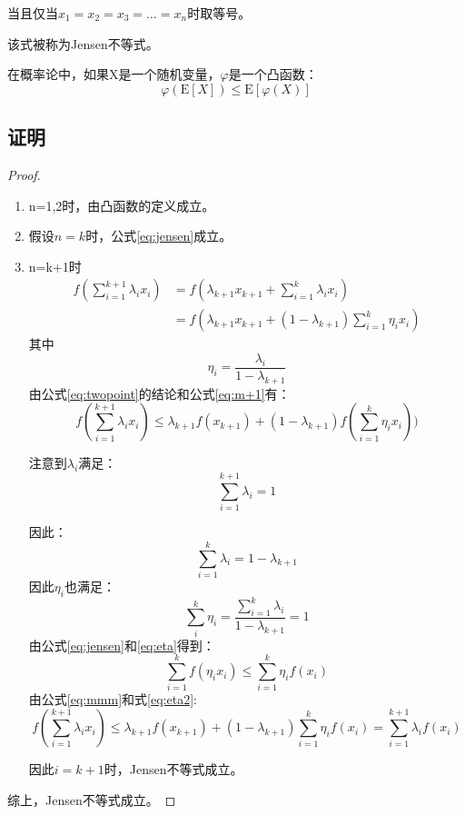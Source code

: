\documentclass[a4paper]{article} %
\numberwithin{equation}{section} %
\begin{document}
当且仅当$x_1=x_2=x_3=\ldots=x_n$时取等号。

该式被称为Jensen不等式。

在概率论中，如果X是一个随机变量，$\varphi$是一个凸函数：
\begin{equation}
\varphi(\mathrm{E}[X])\le \mathrm{E}[\varphi(X)]
\end{equation}

\subsection{证明}

\begin{proof}
\begin{enumerate}
\item n=1,2时，由凸函数的定义成立。
\item 假设$n=k$时，公式\eqref{eq:jensen}成立。
\item n=k+1时
\begin{align}
f(\sum_{i=1}^{k+1}\lambda_i x_i) 
&=f(\lambda_{k+1}x_{k+1}+\sum_{i=1}^k\lambda_i x_i) \\
&=f(\lambda_{k+1}x_{k+1}+(1-\lambda_{k+1})\sum_{i=1}^k\eta_i x_i) \label{eq:m+1}
\end{align}
其中
\begin{equation}
\eta_i=\frac{\lambda_i}{1-\lambda_{k+1}} 
\end{equation}
由公式\eqref{eq:twopoint}的结论和公式\eqref{eq:m+1}有：
\begin{equation}
f(\sum_{i=1}^{k+1}\lambda_i x_i)\le \lambda_{k+1}f(x_{k+1})+(1-\lambda_{k+1})f(\sum_{i=1}^k\eta_i x_i)) \label{eq:mmm}
\end{equation}

注意到$\lambda_i$满足：
\begin{equation}
\sum_{i=1}^{k+1}\lambda_i=1
\end{equation}

因此：
\begin{equation}
\sum_{i=1}^k\lambda_i=1-\lambda_{k+1}
\end{equation}
因此$\eta_i$也满足：
\begin{equation}
\sum_{i}^k\eta_i=\frac{\sum_{i=1}^k\lambda_i}{1-\lambda_{k+1}}=1 \label{eq:eta}
\end{equation}
由公式\eqref{eq:jensen}和\eqref{eq:eta}得到：
\begin{equation}
\sum_{i=1}^kf(\eta_ix_i) \le \sum_{i=1}^{k}\eta_if(x_i) \label{eq:eta2}
\end{equation}
由公式\eqref{eq:mmm}和式\eqref{eq:eta2}:
\begin{equation}
f(\sum_{i=1}^{k+1}\lambda_ix_i)\le \lambda_{k+1}f(x_{k+1})+(1-\lambda_{k+1})\sum_{i=1}^k\eta_if(x_i)=\sum_{i=1}^{k+1}\lambda_if(x_i)
\end{equation}

因此$i=k+1$时，Jensen不等式成立。
\end{enumerate}
综上，Jensen不等式成立。
\end{proof}
\end{document}
